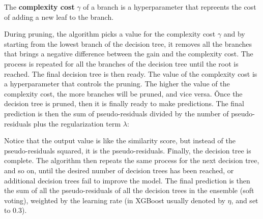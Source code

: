 The \textbf{complexity cost} $\gamma$ of a branch is a hyperparameter that repreents the cost of adding a new leaf to
the branch.
\ed

During pruning, the algorithm picks a value for the complexity cost $\gamma$ and by starting from the lowest branch
of the decision tree, it removes all the branches that brings a negative difference between the gain and the
complexity cost. The process is repeated for all the branches of the decision tree until the root is reached. The
final decision tree is then ready. The value of the complexity cost is a hyperparameter that controls the pruning.
The higher the value of the complexity cost, the more branches will be pruned, and vice versa. \v

Once the decision tree is pruned, then it is finally ready to make predictions. The final prediction is then the
sum of pseudo-residuals divided by the number of pseudo-residuals plus the regularization term $\lambda$:
\bse
{}
\ese

Notice that the output value is like the similarity score, but instead of the pseudo-residuals squared, it is the
pseudo-residuals. \v

Finally, the decision tree is complete. The algorithm then repeats the same process for the next decision tree, and
so on, until the desired number of decision trees has been reached, or additional decision trees fail to improve the
model. The final prediction is then the sum of all the pseudo-residuals of all the decision trees in the ensemble (soft
voting), weighted by the learning rate (in XGBoost usually denoted by $\eta$, and set to 0.3).
